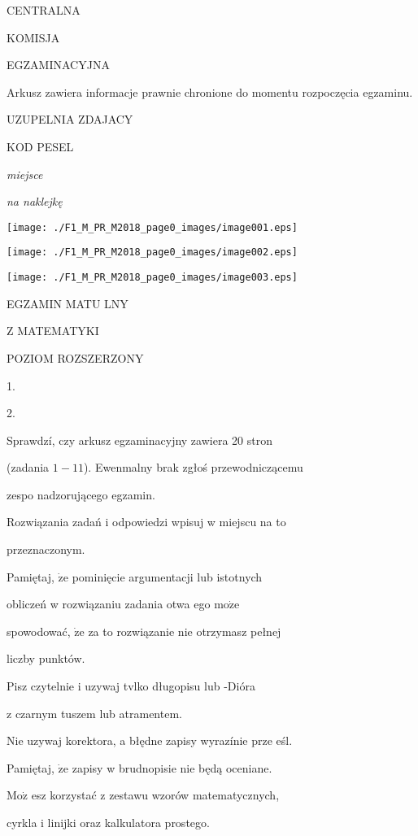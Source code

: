 \documentclass[a4paper,12pt]{article}
\begin{document}
CENTRALNA

KOMISJA

EGZAMINACYJNA

Arkusz zawiera informacje prawnie chronione do momentu rozpoczęcia egzaminu.

UZUPELNIA ZDAJACY

KOD PESEL

{\it miejsce}

{\it na naklejkę}
\begin{center}
\texttt{[image: ./F1\_M\_PR\_M2018\_page0\_images/image001.eps]}

\texttt{[image: ./F1\_M\_PR\_M2018\_page0\_images/image002.eps]}

\texttt{[image: ./F1\_M\_PR\_M2018\_page0\_images/image003.eps]}
\end{center}
EGZAMIN MATU LNY

Z MATEMATYKI

POZIOM ROZSZERZONY

1.

2.

Sprawdzí, czy arkusz egzaminacyjny zawiera 20 stron

(zadania $1-11$). Ewenmalny brak zgłoś przewodniczącemu

zespo nadzorującego egzamin.

Rozwiązania zadań i odpowiedzi wpisuj w miejscu na to

przeznaczonym.

Pamiętaj, $\dot{\mathrm{z}}\mathrm{e}$ pominięcie argumentacji lub istotnych

obliczeń w rozwiązaniu zadania otwa ego $\mathrm{m}\mathrm{o}\dot{\mathrm{z}}\mathrm{e}$

spowodować, $\dot{\mathrm{z}}\mathrm{e}$ za to rozwiązanie nie otrzymasz pełnej

liczby punktów.

Pisz czytelnie i uzywaj tvlko długopisu lub -Dióra

z czarnym tuszem lub atramentem.

Nie uzywaj korektora, a błędne zapisy wyrazínie prze eśl.

Pamiętaj, $\dot{\mathrm{z}}\mathrm{e}$ zapisy w brudnopisie nie będą oceniane.

$\mathrm{M}\mathrm{o}\dot{\mathrm{z}}$ esz korzystać z zestawu wzorów matematycznych,

cyrkla i linijki oraz kalkulatora prostego.
\end{document}
